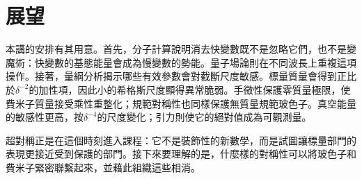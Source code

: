 \begin{classroomqa}
\end{classroomqa}

\begin{classroomqa}
\end{classroomqa}

\section{展望}

本講的安排有其用意。首先，分子計算說明消去快變數既不是忽略它們，也不是變魔術：快變數的基態能量會成為慢變數的勢能。量子場論則在不同波長上重複這項操作。接著，量綱分析揭示哪些有效參數會對截斷尺度敏感。標量質量會得到正比於\(\delta^{-2}\)的加性項，因此小的希格斯尺度顯得異常脆弱。手徵性保護零質量極限，使費米子質量接受乘性重整化；規範對稱性也同樣保護無質量規範玻色子。真空能量的敏感性更高，按\(\delta^{-4}\)的尺度變化；引力則使它的絕對值成為可觀測量。

超對稱正是在這個時刻進入課程：它不是裝飾性的新數學，而是試圖讓標量部門的表現更接近受到保護的部門。接下來要理解的是，什麼樣的對稱性可以將玻色子和費米子緊密聯繫起來，並藉此組織這些相消。